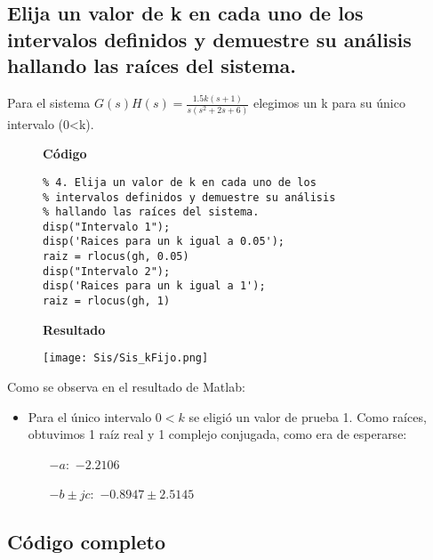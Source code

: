 \subsection{Elija un valor de k en cada uno de los intervalos definidos y demuestre su análisis hallando las raíces del sistema.}
Para el sistema $G(s)H(s) = \displaystyle \frac{1.5k(s+1)}{s(s^2+2s+6)}$ elegimos un k para su único intervalo (0<k).

\begin{figure}[H]
    \begin{framed}
        \centering
        \begin{minipage}[t]{.45\textwidth}
            \textbf{Código}
            \begin{verbatim}
% 4. Elija un valor de k en cada uno de los
% intervalos definidos y demuestre su análisis
% hallando las raíces del sistema.
disp("Intervalo 1");
disp('Raices para un k igual a 0.05');
raiz = rlocus(gh, 0.05)
disp("Intervalo 2");
disp('Raices para un k igual a 1');
raiz = rlocus(gh, 1)
            \end{verbatim}
        \end{minipage}
        \quad
        \begin{minipage}[t]{.45\textwidth}
            \textbf{Resultado}
            
            \texttt{[image: Sis/Sis\_kFijo.png]}
        \end{minipage}
    \end{framed}
\end{figure}
Como se observa en el resultado de Matlab:
\begin{itemize}
    \item Para el único intervalo $0<k$ se eligió un valor de prueba 1. Como raíces, obtuvimos 1 raíz real y 1 complejo conjugada, como era de esperarse:
    \begin{itemize}
        \item [$-a:$] $-2.2106$
        \item [$-b\pm jc:$] $-0.8947\pm 2.5145$
    \end{itemize}
\end{itemize}

\subsection{Código completo}
\begin{tcolorbox}
    \inputminted{Matlab}{Sis/sis.m}
\end{tcolorbox}